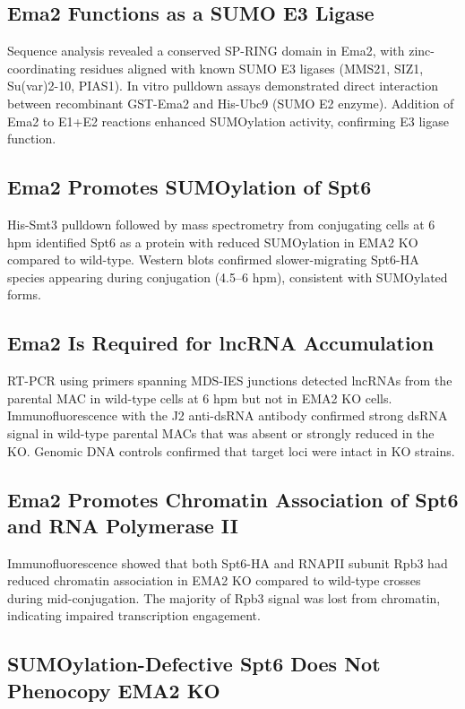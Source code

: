 \documentclass[11pt]{article}
\begin{document}
\subsection{Ema2 Functions as a SUMO E3 Ligase}

Sequence analysis revealed a conserved SP-RING domain in Ema2, with zinc-coordinating residues aligned with known SUMO E3 ligases (MMS21, SIZ1, Su(var)2-10, PIAS1). In vitro pulldown assays demonstrated direct interaction between recombinant GST-Ema2 and His-Ubc9 (SUMO E2 enzyme). Addition of Ema2 to E1+E2 reactions enhanced SUMOylation activity, confirming E3 ligase function.

\subsection{Ema2 Promotes SUMOylation of Spt6}

His-Smt3 pulldown followed by mass spectrometry from conjugating cells at 6 hpm identified Spt6 as a protein with reduced SUMOylation in EMA2 KO compared to wild-type. Western blots confirmed slower-migrating Spt6-HA species appearing during conjugation (4.5--6 hpm), consistent with SUMOylated forms.

\subsection{Ema2 Is Required for lncRNA Accumulation}

RT-PCR using primers spanning MDS-IES junctions detected lncRNAs from the parental MAC in wild-type cells at 6 hpm but not in EMA2 KO cells. Immunofluorescence with the J2 anti-dsRNA antibody confirmed strong dsRNA signal in wild-type parental MACs that was absent or strongly reduced in the KO. Genomic DNA controls confirmed that target loci were intact in KO strains.

\subsection{Ema2 Promotes Chromatin Association of Spt6 and RNA Polymerase II}

Immunofluorescence showed that both Spt6-HA and RNAPII subunit Rpb3 had reduced chromatin association in EMA2 KO compared to wild-type crosses during mid-conjugation. The majority of Rpb3 signal was lost from chromatin, indicating impaired transcription engagement.

\subsection{SUMOylation-Defective Spt6 Does Not Phenocopy EMA2 KO}
\end{document}

